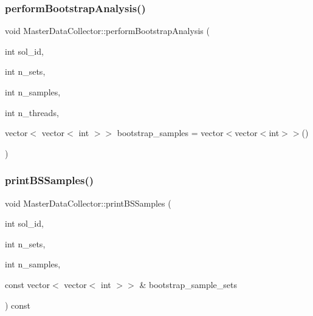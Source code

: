 \mbox{\label{classMasterDataCollector_acbf0e8a8f30e483e504d756883d45cf0_acbf0e8a8f30e483e504d756883d45cf0}} 
\subsubsection{\texorpdfstring{perform\+Bootstrap\+Analysis()}{performBootstrapAnalysis()}}
{\footnotesize\ttfamily void Master\+Data\+Collector\+::perform\+Bootstrap\+Analysis (\begin{DoxyParamCaption}\item[{int}]{sol\+\_\+id,  }\item[{int}]{n\+\_\+sets,  }\item[{int}]{n\+\_\+samples,  }\item[{int}]{n\+\_\+threads,  }\item[{vector$<$ vector$<$ int $>$$>$}]{bootstrap\+\_\+samples = {\ttfamily vector$<$vector$<$int$>$$>$()} }\end{DoxyParamCaption})}

\mbox{\label{classMasterDataCollector_a458ff4ee13e7cce91aee043b65c7c443_a458ff4ee13e7cce91aee043b65c7c443}} 
\subsubsection{\texorpdfstring{print\+B\+S\+Samples()}{printBSSamples()}}
{\footnotesize\ttfamily void Master\+Data\+Collector\+::print\+B\+S\+Samples (\begin{DoxyParamCaption}\item[{int}]{sol\+\_\+id,  }\item[{int}]{n\+\_\+sets,  }\item[{int}]{n\+\_\+samples,  }\item[{const vector$<$ vector$<$ int $>$$>$ \&}]{bootstrap\+\_\+sample\+\_\+sets }\end{DoxyParamCaption}) const}

